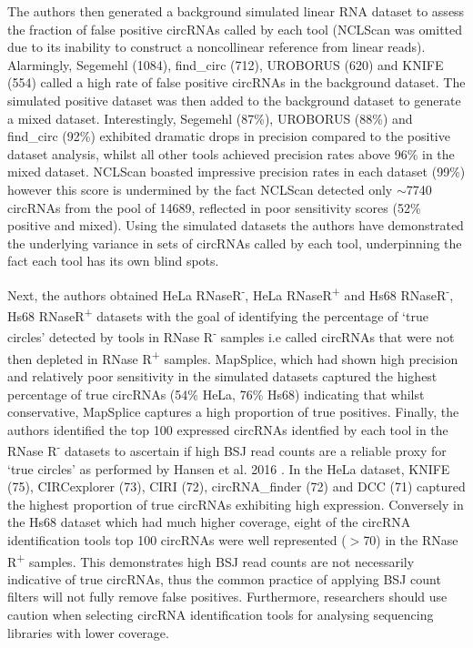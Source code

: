 The authors then generated a background simulated linear RNA dataset to assess the fraction of false positive circRNAs called by each tool (NCLScan was omitted due to its inability to construct a noncollinear reference from linear reads). Alarmingly, Segemehl (1084), find\_circ (712), UROBORUS (620) and KNIFE (554) called a high rate of false positive circRNAs in the background dataset. The simulated positive dataset was then added to the background dataset to generate a mixed dataset. Interestingly, Segemehl (87\%), UROBORUS (88\%) and find\_circ (92\%) exhibited dramatic drops in precision compared to the positive dataset analysis, whilst all other tools achieved precision rates above 96\% in the mixed dataset. NCLScan boasted impressive precision rates in each dataset (99\%) however this score is undermined by the fact NCLScan detected only $\sim$7740 circRNAs from the pool of 14689, reflected in poor sensitivity scores (52\% positive and mixed). Using the simulated datasets the authors have demonstrated the underlying variance in sets of circRNAs called by each tool, underpinning the fact each tool has its own blind spots. \par

Next, the authors obtained HeLa RNaseR\textsuperscript{-}, HeLa RNaseR\textsuperscript{+} and Hs68 RNaseR\textsuperscript{-}, Hs68 RNaseR\textsuperscript{+} datasets with the goal of identifying the percentage of `true circles' detected by tools in RNase R\textsuperscript{-} samples i.e called circRNAs that were not then depleted in RNase R\textsuperscript{+} samples. MapSplice, which had shown high precision and relatively poor sensitivity in the simulated datasets captured the highest percentage of true circRNAs (54\% HeLa, 76\% Hs68) indicating that whilst conservative, MapSplice captures a high proportion of true positives. Finally, the authors identified the top 100 expressed circRNAs identfied by each tool in the RNase R\textsuperscript{-} datasets to ascertain if high BSJ read counts are a reliable proxy for `true circles' as performed by Hansen et al. 2016 \cite{Hansen2016Apr}. In the HeLa dataset, KNIFE (75), CIRCexplorer (73), CIRI (72), circRNA\_finder (72) and DCC (71) captured the highest proportion of true circRNAs exhibiting high expression. Conversely in the Hs68 dataset which had much higher coverage, eight of the circRNA identification tools top 100 circRNAs were well represented ($>$70) in the RNase R\textsuperscript{+} samples. This demonstrates high BSJ read counts are not necessarily indicative of true circRNAs, thus the common practice of applying BSJ count filters will not fully remove false positives. Furthermore, researchers should use caution when selecting circRNA identification tools for analysing sequencing libraries with lower coverage. \par

